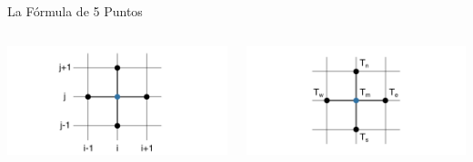 \documentclass{beamer}
\begin{document}
\begin{frame}{La Fórmula de 5 Puntos}
    \begin{columns}
        \begin{column}{0.5\textwidth}
            \includegraphics[width=1.3\textwidth]{3.png}
        \end{column}
        \begin{column}{0.5\textwidth}
            \includegraphics[width=1.3\textwidth]{3_compass.png}
        \end{column}
    \end{columns}
\end{frame}
\end{document}

